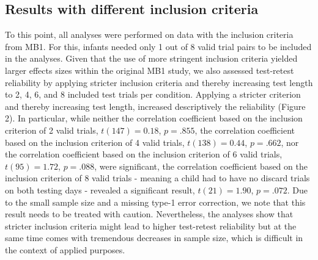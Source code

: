 \documentclass[
  english,
  man,floatsintext]{apa6}
\begin{document}
\hypertarget{results-with-different-inclusion-criteria}{%
\subsection{Results with different inclusion criteria}\label{results-with-different-inclusion-criteria}}

To this point, all analyses were performed on data with the inclusion criteria from MB1. For this, infants needed only 1 out of 8 valid trial pairs to be included in the analyses. Given that the use of more stringent inclusion criteria yielded larger effects sizes within the original MB1 study, we also assessed test-retest reliability by applying stricter inclusion criteria and thereby increasing test length to 2, 4, 6, and 8 included test trials per condition. Applying a stricter criterion and thereby increasing test length, increased descriptively the reliability (Figure 2). In particular, while neither the correlation coefficient based on the inclusion criterion of 2 valid trials, \(t(147) = 0.18\), \(p = .855\), the correlation coefficient based on the inclusion criterion of 4 valid trials, \(t(138) = 0.44\), \(p = .662\), nor the correlation coefficient based on the inclusion criterion of 6 valid trials, \(t(95) = 1.72\), \(p = .088\), were significant, the correlation coefficient based on the inclusion criterion of 8 valid trials - meaning a child had to have no discard trials on both testing days - revealed a significant result, \(t(21) = 1.90\), \(p = .072\). Due to the small sample size and a missing type-1 error correction, we note that this result needs to be treated with caution. Nevertheless, the analyses show that stricter inclusion criteria might lead to higher test-retest reliability but at the same time comes with tremendous decreases in sample size, which is difficult in the context of applied purposes.
\end{document}
